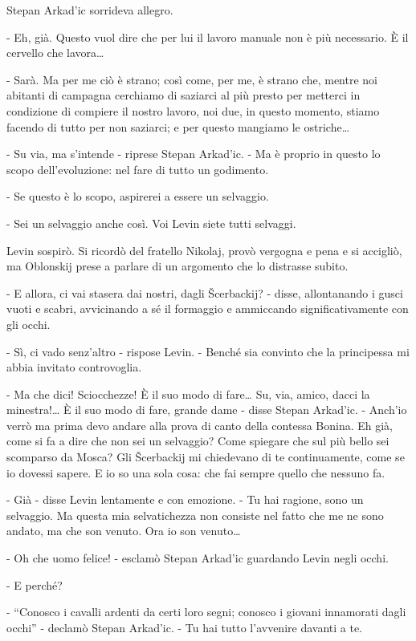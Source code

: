 Stepan Arkad'ic sorrideva allegro. 

- Eh, già. Questo vuol dire che per lui il lavoro manuale non è più necessario. È il cervello che lavora\ldots{} 

- Sarà. Ma per me ciò è strano; così come, per me, è strano che, mentre noi abitanti di campagna cerchiamo di saziarci al più presto per metterci in condizione di compiere il nostro lavoro, noi due, in questo momento, stiamo facendo di tutto per non saziarci; e per questo mangiamo le ostriche\ldots{} 

- Su via, ma s'intende - riprese Stepan Arkad'ic. - Ma è proprio in questo lo scopo dell'evoluzione: nel fare di tutto un godimento. 

- Se questo è lo scopo, aspirerei a essere un selvaggio. 

- Sei un selvaggio anche così. Voi Levin siete tutti selvaggi. 

Levin sospirò. Si ricordò del fratello Nikolaj, provò vergogna e pena e si accigliò, ma Oblonskij prese a parlare di un argomento che lo distrasse subito. 

- E allora, ci vai stasera dai nostri, dagli Šcerbackij? - disse, allontanando i gusci vuoti e scabri, avvicinando a sé il formaggio e ammiccando significativamente con gli occhi. 

- Sì, ci vado senz'altro - rispose Levin. - Benché sia convinto che la principessa mi abbia invitato controvoglia. 

- Ma che dici! Sciocchezze! È il suo modo di fare\ldots{} Su, via, amico, dacci la minestra!\ldots{} È il suo modo di fare, grande dame - disse Stepan Arkad'ic. - Anch'io verrò ma prima devo andare alla prova di canto della contessa Bonina. Eh già, come si fa a dire che non sei un selvaggio? Come spiegare che sul più bello sei scomparso da Mosca? Gli Šcerbackij mi chiedevano di te continuamente, come se io dovessi sapere. E io so una sola cosa: che fai sempre quello che nessuno fa. 

- Già - disse Levin lentamente e con emozione. - Tu hai ragione, sono un selvaggio. Ma questa mia selvatichezza non consiste nel fatto che me ne sono andato, ma che son venuto. Ora io son venuto\ldots{} 

- Oh che uomo felice! - esclamò Stepan Arkad'ic guardando Levin negli occhi. 

- E perché? 

- ``Conosco i cavalli ardenti da certi loro segni; conosco i giovani innamorati dagli occhi'' - declamò Stepan Arkad'ic. - Tu hai tutto l'avvenire davanti a te. 

